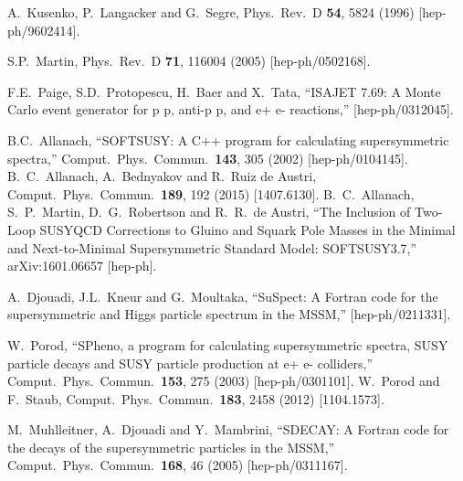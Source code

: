 \documentclass[12pt]{article}
\begin{document}
\begin{thebibliography}{999}
A.~Kusenko, P.~Langacker and G.~Segre, 
  Phys.\ Rev.\ D {\bf 54}, 5824 (1996)
  [hep-ph/9602414].

  S.P.~Martin,
  Phys.\ Rev.\  D {\bf 71}, 116004 (2005)
  [hep-ph/0502168].

F.E.~Paige, S.D.~Protopescu, H.~Baer and X.~Tata,
  ``ISAJET 7.69: A Monte Carlo event generator for p p, anti-p p, and e+ e-
  reactions,''
  [hep-ph/0312045].

B.C.~Allanach,
  ``SOFTSUSY: A C++ program for calculating supersymmetric spectra,''
  Comput.\ Phys.\ Commun.\  {\bf 143}, 305 (2002)
  [hep-ph/0104145].
  B.~C.~Allanach, A.~Bednyakov and R.~Ruiz de Austri,
  Comput.\ Phys.\ Commun.\  {\bf 189}, 192 (2015)
  [1407.6130].
B.~C.~Allanach, S.~P.~Martin, D.~G.~Robertson and R.~R.~de Austri,
  ``The Inclusion of Two-Loop SUSYQCD Corrections to Gluino and Squark Pole Masses in the Minimal and Next-to-Minimal Supersymmetric Standard Model: SOFTSUSY3.7,''
  arXiv:1601.06657 [hep-ph].
    
A.~Djouadi, J.L.~Kneur and G.~Moultaka,
  ``SuSpect: A Fortran code for the supersymmetric and Higgs particle spectrum
  in the MSSM,''
  [hep-ph/0211331].

W.~Porod,
  ``SPheno, a program for calculating supersymmetric spectra, SUSY particle
  decays and SUSY particle production at e+ e- colliders,''
  Comput.\ Phys.\ Commun.\  {\bf 153}, 275 (2003)
  [hep-ph/0301101].
W.~Porod and F.~Staub,
  Comput.\ Phys.\ Commun.\  {\bf 183}, 2458 (2012)
  [1104.1573].
  
M.~Muhlleitner, A.~Djouadi and Y.~Mambrini,
  ``SDECAY: A Fortran code for the decays of the supersymmetric particles in
  the MSSM,''
  Comput.\ Phys.\ Commun.\  {\bf 168}, 46 (2005)
  [hep-ph/0311167].


\end{thebibliography}
\end{document}
